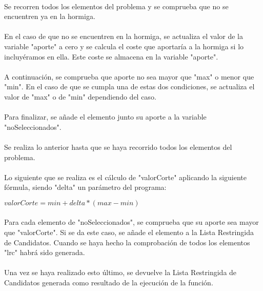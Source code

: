 	\paragraph{}Se recorren todos los elementos del problema y se comprueba que no se encuentren ya en la hormiga.
	
	\paragraph{}En el caso de que no se encuentren en la hormiga, se actualiza el valor de la variable "aporte" a cero y se calcula el coste que aportaría a la hormiga si lo incluyéramos en ella. Este coste se almacena en la variable "aporte".
	
	\paragraph{}A continuación, se comprueba que aporte no sea mayor que "max" o menor que "min". En el caso de que se cumpla una de estas dos condiciones, se actualiza el valor de "max" o de "min" dependiendo del caso.
	
	\paragraph{}Para finalizar, se añade el elemento junto su aporte a la variable "noSeleccionados".
	
	\paragraph{}Se realiza lo anterior hasta que se haya recorrido todos los elementos del problema.
	
	\paragraph{} Lo siguiente que se realiza es el cálculo de "valorCorte" aplicando la siguiente fórmula, siendo "delta" un parámetro del programa:
	
	\begin{center}
		$valorCorte = min + delta * ( max - min )$
	\end{center}
	
	\paragraph{}Para cada elemento de "noSeleccionados", se comprueba que su aporte sea mayor que "valorCorte". Si se da este caso, se añade el elemento a la Lista Restringida de Candidatos. Cuando se haya hecho la comprobación de todos los elementos "lrc" habrá sido generada.
	
	\paragraph{}Una vez se haya realizado esto último, se devuelve la Lista Restringida de Candidatos generada como resultado de la ejecución de la función.